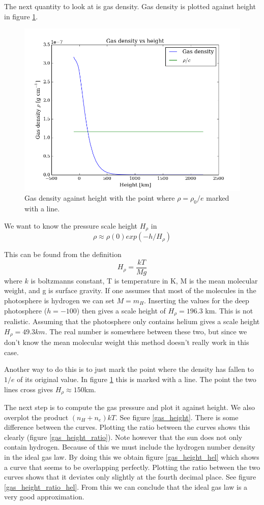 \documentclass{aa}   %
\begin{document}
The next quantity to look at is gas density. Gas density is plotted against height in figure \ref{gdens_height}.

\begin{figure}
 \includegraphics[width=.49\textwidth]{gdens_height.png}
 \caption{Gas density against height with the point where $\rho = \rho_0/e$ marked with a line.}
 \label{gdens_height} 
\end{figure}

We want to know the pressure scale height $H_\rho$ in  
\begin{equation}
 \rho \approx \rho(0)exp(-h/H_{\rho})
\end{equation}

This can be found from the definition
\begin{equation}
 H_\rho = \frac{kT}{M g}
\end{equation}
where $k$ is boltzmanns constant, T is temperature in K, M is the mean molecular weight, and g is surface gravity.
If one assumes that most of the molecules in the photosphere is hydrogen we can set $M=m_H$. Inserting the values for the deep photosphere ($h = -100$) then gives a scale height of $H_\rho = 196.3$ km. This is not realistic. Assuming that the photosphere only contains helium gives a scale height $H_\rho = 49.3 km$. The real number is somewhere between these two, but since we don't know the mean molecular weight this method doesn't really work in this case.

Another way to do this is to just mark the point where the density has fallen to $1/e$ of its original value. In figure \ref{gdens_height} this is marked with a line. The point the two lines cross gives $H_\rho \approx 150 $km.

The next step is to compute the gas pressure and plot it against height. We also overplot the product $(n_H + n_e)kT$. See figure \ref{gas_height}. There is some difference between the curves. Plotting the ratio between the curves shows this clearly (figure \ref{gas_height_ratio}). Note however that the sun does not only contain hydrogen. Because of this we must include the hydrogen number density in the ideal gas law. By doing this we obtain figure \ref{gas_height_hel} which shows a curve that seems to be overlapping perfectly. Plotting the ratio between the two curves shows that it deviates only slightly at the fourth decimal place. See figure \ref{gas_height_ratio_hel}. From this we can conclude that the ideal gas law is a very good approximation.
\end{document}
